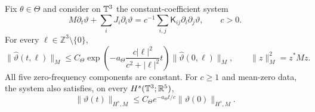 \begin{proposition}\label{ons:fourier}
 Fix $\theta\in\Theta$ and consider on $\mathbb T^3$ the constant-coefficient system
 \begin{equation}\label{ons:frozen-system}
 M\partial_t\vartheta+\sum_iJ_i\partial_i\vartheta
       =c^{-1}\sum_{i,j}\mathsf K_{ij}\partial_i\partial_j\vartheta,
       \qquad c>0.
 \end{equation}
 For every $\ell\in\mathbb Z^3\setminus\{0\}$,
 \begin{equation}\label{ons:fourier-decay}
 \|\widehat\vartheta(t,\ell)\|_M
 \le C_\Theta\exp\!\left(-a_\Theta
           \frac{c|\ell|^2}{c^2+|\ell|^2}t\right)
           \|\widehat\vartheta(0,\ell)\|_M,
 \qquad\|z\|_M^2=z^*Mz.
 \end{equation}
 All five zero-frequency components are constant.
 For $c\ge1$ and mean-zero data, the system also satisfies, on every
 $H^s(\mathbb T^3;\mathbb R^5)$,
 \begin{equation}\label{ons:torus-decay}
 \|\vartheta(t)\|_{H^s,M}
       \le C_\Theta e^{-a_\Theta t/c}\|\vartheta(0)\|_{H^s,M}.
 \end{equation}
\end{proposition}
